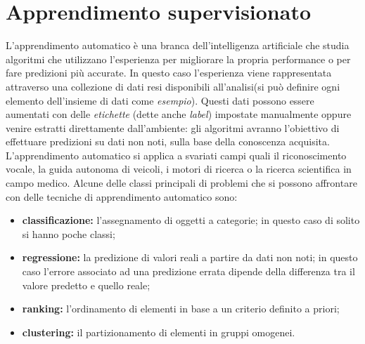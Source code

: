 \documentclass[oneside, openany]{book}
\begin{document}
		\section{Apprendimento supervisionato}
		L'apprendimento automatico è una branca dell'intelligenza artificiale che studia algoritmi che utilizzano l'esperienza per migliorare la propria performance o per fare predizioni più accurate. In questo caso l'esperienza viene rappresentata attraverso una collezione di dati resi disponibili all'analisi(si può definire ogni elemento dell'insieme di dati come \textit{esempio}). Questi dati possono essere aumentati con delle \textit{etichette} (dette anche \textit{label}) impostate manualmente oppure venire estratti direttamente dall'ambiente: gli algoritmi avranno l'obiettivo di effettuare predizioni su dati non noti, sulla base della conoscenza acquisita.
		L'apprendimento automatico si applica a svariati campi quali il riconoscimento vocale, la guida autonoma di veicoli, i motori di ricerca o la ricerca scientifica in campo medico. Alcune delle classi principali di problemi che si possono affrontare con delle tecniche di apprendimento automatico sono:
		\begin{itemize}
			\item\textbf{classificazione:} l'assegnamento di oggetti a categorie; in questo caso di solito si hanno poche classi;
			\item\textbf{regressione:} la predizione di valori reali a partire da dati non noti; in questo caso l'errore associato ad una predizione errata dipende della differenza tra il valore predetto e quello reale;
			\item\textbf{ranking:} l'ordinamento di elementi in base a un criterio definito a priori;
			\item\textbf{clustering:} il partizionamento di elementi in gruppi omogenei.
		\end{itemize}
	
\end{document}
